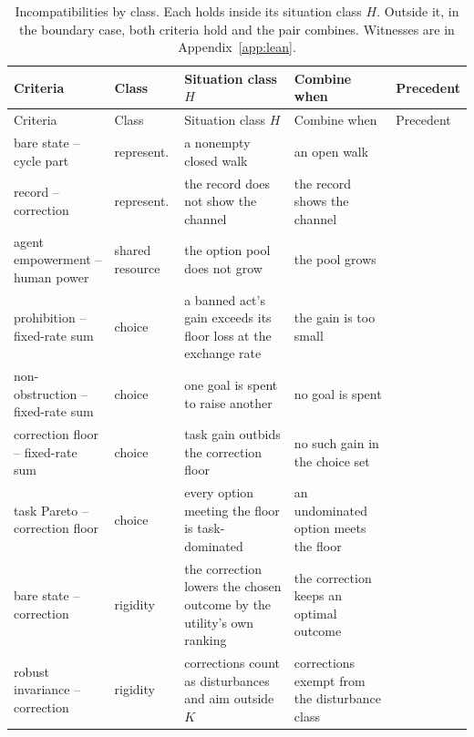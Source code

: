 \documentclass[11pt]{article}
\begin{document}
{\footnotesize
\setlength{\tabcolsep}{3pt}
\begin{xltabular}{\textwidth}{@{}L{2.6cm} L{1.6cm} Y Y L{2.2cm}@{}}
\caption{Incompatibilities by class. Each holds inside its situation class $H$. Outside it, in the boundary case, both criteria hold and the pair combines. Witnesses are in Appendix~\ref{app:lean}.}\label{tab:conflicts}\\
\toprule
Criteria & Class & Situation class $H$ & Combine when & Precedent \\
\midrule
\endfirsthead
\toprule
Criteria & Class & Situation class $H$ & Combine when & Precedent \\
\midrule
\endhead
\bottomrule
\endfoot
bare state -- cycle part & represent. & a nonempty closed walk & an open walk & \cite{ng1999shaping,jiang2011hodgerank} \\
record -- correction & represent. & the record does not show the channel & the record shows the channel & \cite{soares2015corrigibility,turner2021corrigibilityvnm} \\
agent empowerment -- human power & shared resource & the option pool does not grow & the pool grows & \cite{turner2021seekpower} \\
prohibition -- fixed-rate sum & choice & a banned act's gain exceeds its floor loss at the exchange rate & the gain is too small & \cite{han1979exact} \\
non-obstruction -- fixed-rate sum & choice & one goal is spent to raise another & no goal is spent & \cite{turner2020nonobstruction} \\
correction floor -- fixed-rate sum & choice & task gain outbids the correction floor & no such gain in the choice set & \cite{turner2021corrigibilityvnm} \\
task Pareto -- correction floor & choice & every option meeting the floor is task-dominated & an undominated option meets the floor & \cite{roijers2013multiobjective} \\
bare state -- correction & rigidity & the correction lowers the chosen outcome by the utility's own ranking & the correction keeps an optimal outcome & \cite{soares2015corrigibility,turner2021corrigibilityvnm,omohundro2008basic} \\
robust invariance -- correction & rigidity & corrections count as disturbances and aim outside $K$ & corrections exempt from the disturbance class & \cite{aubin2011viability} \\
\end{xltabular}
}
\end{document}
